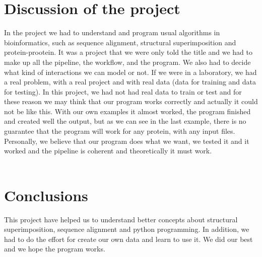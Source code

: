 \documentclass[a4paper,10pt]{report}
\begin{document}
\chapter{Discussion of the project}

In the project we had to understand and program usual algorithms in bioinformatics, such as sequence alignment, structural superimposition and protein-prootein. It was a project that we were only told the title and we had to make up all the pipeline, the workflow, and the program. We also had to decide what kind of interactions we can model or not.
If we were in a laboratory, we had a real problem, with a real project and with real data (data for training and data for testing). In this project, we had not had real data to train or test and for these reason we may think that our program works correctly and actually it could not be like this. With our own examples it almost worked, the program finished and created well the output, but as we can see in the last example, there is no guarantee that the program will work for any protein, with any input files. Personally, we believe that our program does what we want, we tested it and it worked and the pipeline is coherent and theoretically it must work.\\\\

\chapter{Conclusions}

This project have helped us to understand better concepts about structural superimposition, sequence alignment and python programming. In addition, we had to do the effort for create our own data and learn to use it. We did our best and we hope the program works.
\end{document}

